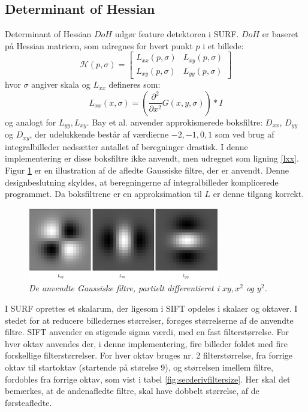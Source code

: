 \subsection{Determinant of Hessian}
Determinant of Hessian $DoH$ udgør feature detektoren i SURF. $DoH$ er baseret på Hessian matricen, som udregnes for hvert punkt $p$ i et billede:
\begin{equation}
\mathcal{H}(p, \sigma) = 
 \begin{bmatrix}
 	L_{xx}(p, \sigma) & L_{xy}(p, \sigma) \\
 	L_{xy}(p, \sigma) & L_{yy}(p, \sigma) 
 \end{bmatrix}
 \label{hessianmatrix}
\end{equation}
hvor $\sigma$ angiver skala og $L_{xx}$ defineres som: 
\begin{equation}
L_{xx}(x, \sigma) = (\frac{\partial^2 }{\partial x^2 } G(x,y,\sigma)) * I
\label{lxx}
\end{equation}
og analogt for $L_{yy}, L_{xy}$. Bay et al. anvender approkismerede boksfiltre: $D_{xx}$, $D_{yy}$ og $D_{xy}$, der udelukkende består af værdierne $-2,-1,0, 1$ som ved brug af integralbilleder nedsætter antallet af beregninger drastisk. I denne implementering er disse boksfiltre ikke anvendt, men udregnet som ligning \eqref{lxx}. Figur \ref{fig:lxxlyylxy} er en illustration af de afledte Gaussiske filtre, der er anvendt. Denne designbeslutning skyldes, at beregningerne af integralbilleder komplicerede programmet. Da 
boksfiltrene er en approksimation til $L$ er denne tilgang korrekt.
\begin{figure}[H]
    \centering
    \includegraphics[width=0.75\textwidth]{fig/31.png}
     \vspace{-0.5em}
    \begin{center}    
       \caption{{\footnotesize \textit{De anvendte Gaussiske filtre, partielt differentieret i $xy,x^2$ og $y^2$.}}}
    \label{fig:lxxlyylxy}
     \end{center}
     \vspace{-2.5em}
  \end{figure} \noindent
I SURF oprettes et skalarum, der ligesom i SIFT opdeles i skalaer og oktaver. I stedet for at reducere billedernes størrelser, forøges størrelserne af de anvendte filtre. SIFT anvender en stigende sigma værdi, med en fast filterstørrelse. For hver oktav anvendes der, i denne implementering, fire billeder foldet med fire forskellige filterstørrelser. For hver oktav bruges nr. 2 filterstørrelse, fra forrige oktav til startoktav (startende på størelse 9), og størrelsen imellem filtre, fordobles fra forrige oktav, som vist i tabel \ref{fig:secderivfiltersize}. Her skal det bemærkes, at de andenafledte filtre, skal have dobbelt størrelse, af de førsteafledte.
